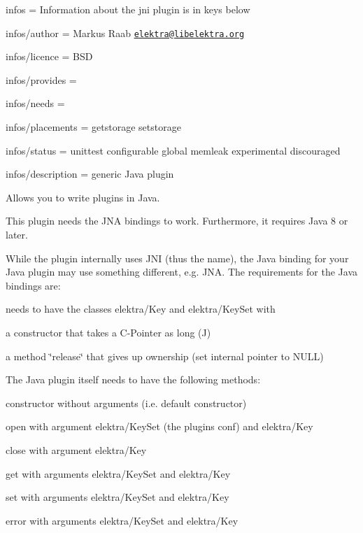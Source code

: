 
\begin{DoxyItemize}
\item infos = Information about the jni plugin is in keys below
\item infos/author = Markus Raab \href{mailto:elektra@libelektra.org}{\tt elektra@libelektra.\+org}
\item infos/licence = B\+SD
\item infos/provides =
\item infos/needs =
\item infos/placements = getstorage setstorage
\item infos/status = unittest configurable global memleak experimental discouraged
\item infos/description = generic Java plugin
\end{DoxyItemize}

Allows you to write plugins in Java.

This plugin needs the J\+NA bindings to work. Furthermore, it requires Java 8 or later.

While the plugin internally uses J\+NI (thus the name), the Java binding for your Java plugin may use something different, e.\+g. J\+NA. The requirements for the Java bindings are\+:


\begin{DoxyItemize}
\item needs to have the classes {\ttfamily elektra/\+Key} and {\ttfamily elektra/\+Key\+Set} with
\begin{DoxyItemize}
\item a constructor that takes a C-\/\+Pointer as long (J)
\item a method \char`\"{}release\char`\"{} that gives up ownership (set internal pointer to N\+U\+LL)
\end{DoxyItemize}
\end{DoxyItemize}

The Java plugin itself needs to have the following methods\+:


\begin{DoxyItemize}
\item constructor without arguments (i.\+e. default constructor)
\item open with argument {\ttfamily elektra/\+Key\+Set} (the plugin\textquotesingle{}s conf) and {\ttfamily elektra/\+Key}
\item close with argument {\ttfamily elektra/\+Key}
\item get with arguments {\ttfamily elektra/\+Key\+Set} and {\ttfamily elektra/\+Key}
\item set with arguments {\ttfamily elektra/\+Key\+Set} and {\ttfamily elektra/\+Key}
\item error with arguments {\ttfamily elektra/\+Key\+Set} and {\ttfamily elektra/\+Key}
\end{DoxyItemize}

